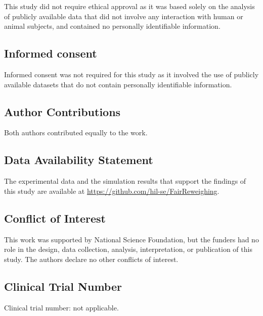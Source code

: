 This study did not require ethical approval as it was based solely on the analysis of publicly available data that did not involve any interaction with human or animal subjects, and contained no personally identifiable information.

\subsection{Informed consent}

Informed consent was not required for this study as it involved the use of publicly available datasets that do not contain personally identifiable information.

\subsection{Author Contributions}
Both authors contributed equally to the work.

\subsection{Data Availability Statement}
The experimental data and the simulation results that support the findings of this study are available at \url{https://github.com/hil-se/FairReweighing}.

\subsection{Conflict of Interest}

This work was supported by National Science Foundation, but the funders had no role in the design, data collection, analysis, interpretation, or publication of this study. The authors declare no other conflicts of interest.

\subsection{Clinical Trial Number}

Clinical trial number: not applicable.



%
%


